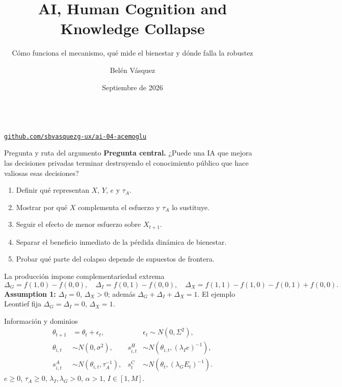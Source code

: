 \documentclass[aspectratio=169,10pt]{beamer}
\title[AKO (2026): auditoría]{AI, Human Cognition and Knowledge Collapse}
\subtitle{Cómo funciona el mecanismo, qué mide el bienestar y dónde falla la robustez}\author{Belén Vásquez}\date{Septiembre de 2026}
\begin{document}
\begin{frame}[plain]\titlepage\begin{center}\paperref\\\href{\RepoURL}{\texttt{github.com/sbvasquezg-ux/ai-04-acemoglu}}\end{center}\end{frame}
\begin{frame}{Pregunta y ruta del argumento}
\textbf{Pregunta central.} ¿Puede una IA que mejora las decisiones privadas terminar destruyendo el conocimiento público que hace valiosas esas decisiones?
\begin{enumerate}\item Definir qué representan $X$, $Y$, $e$ y $\tau_A$.\item Mostrar por qué $X$ complementa el esfuerzo y $\tau_A$ lo sustituye.\item Seguir el efecto de menor esfuerzo sobre $X_{t+1}$.\item Separar el beneficio inmediato de la pérdida dinámica de bienestar.\item Probar qué parte del colapso depende de supuestos de frontera.\end{enumerate}
\end{frame}
\begin{frame}{La producción impone complementariedad extrema}
\[
\Delta_G=f(1,0)-f(0,0),\quad\Delta_I=f(0,1)-f(0,0),\quad
\Delta_X=f(1,1)-f(1,0)-f(0,1)+f(0,0).
\]
\textbf{Assumption 1:} $\Delta_I=0$, $\Delta_X>0$; además $\Delta_G+\Delta_I+\Delta_X=1$. El ejemplo Leontief fija $\Delta_G=\Delta_I=0$, $\Delta_X=1$.
\end{frame}
\begin{frame}{Información y dominios}
\begin{align*}\theta_{t+1}&=\theta_t+\epsilon_t,&&\epsilon_t\sim N(0,\Sigma^2),\\
\theta_{i,t}&\sim N(0,\sigma^2),&s^H_{i,t}&\sim N(\theta_{i,t},(\lambda_Ie)^{-1}),\\
s^A_{i,t}&\sim N(\theta_{i,t},\tau_A^{-1}),&s^C_t&\sim N(\theta_t,(\lambda_GE_t)^{-1}).\end{align*}
$e\ge0$, $\tau_A\ge0$, $\lambda_I,\lambda_G>0$, $\alpha>1$, $I\in[1,M]$.
\end{frame}
\end{document}
